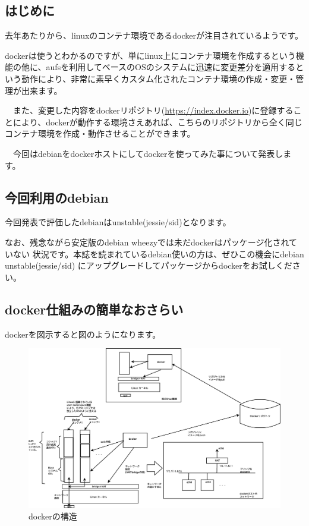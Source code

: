 \documentclass[mingoth,a4paper]{jsarticle}
\begin{document}
\subsection{はじめに}

 去年あたりから、linuxのコンテナ環境であるdocker\cite{docker-orig}が注目されているようです。

 dockerは使うとわかるのですが、単にlinux上にコンテナ環境を作成するという機能の他に、aufsを利用してベースのOSのシステムに迅速に変更差分を適用するという動作により、非常に素早くカスタム化されたコンテナ環境の作成・変更・管理が出来ます。

　また、変更した内容をdockerリポジトリ(\url{https://index.docker.io})に登録することにより、dockerが動作する環境さえあれば、こちらのリポジトリから全く同じコンテナ環境を作成・動作させることができます。

　今回はdebianをdockerホストにしてdockerを使ってみた事について発表します。

\subsection{今回利用のdebian}

 今回発表で評価したdebianはunstable(jessie/sid)となります。

 なお、残念ながら安定版のdebian wheezyでは未だdockerはパッケージ化されていない
状況です。本誌を読まれているdebian使いの方は、ぜひこの機会にdebian unstable(jessie/sid)
にアップグレードしてパッケージからdockerをお試しください。

\subsection{docker仕組みの簡単なおさらい}

 dockerを図示すると図のようになります。

\begin{figure}[H]
\begin{center}
 \includegraphics[width=1.0\hsize]{image201405/docker-overview.eps}
 \caption{dockerの構造}\label{fig:docker-overview}
\end{center}
\end{figure}
\end{document}
